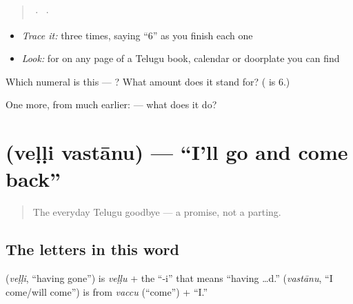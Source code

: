 \begin{quote}
  ·    ·  
\end{quote}

\begin{itemize}
\raggedright
  \item \emph{Trace it:}  three times, saying \textquotedblleft{}6\textquotedblright{} as you finish each one
  \item \emph{Look:} for  on any page of a Telugu book, calendar or doorplate you can find
\end{itemize}

\begin{tcolorbox}[breakable,colback=teal!4,colframe=teal!35!black,title={Before you move on}]
Which numeral is this — ? What amount does it stand for? ( is 6.)

One more, from much earlier:  — what does it do?
\end{tcolorbox}
\section[\texorpdfstring{\te{వెళ్ళి} \te{వస్తాను} (veḷḷi vastānu)}{వెళ్ళి వస్తాను (veḷḷi vastānu)}]{  (veḷḷi vastānu) — \textquotedblleft{}I'll go and come back\textquotedblright{}}

\label{lesson:TE-C04-velli-vastaanu}



\begin{quote}
The everyday Telugu goodbye — a promise, not a parting.
\end{quote}

\subsection*{The letters in this word}
\textbf{} (\emph{veḷḷi}, \textquotedblleft{}having gone\textquotedblright{}) is \emph{veḷḷu} + the \textquotedblleft{}-i\textquotedblright{} that means \textquotedblleft{}having …d.\textquotedblright{} \textbf{} (\emph{vastānu}, \textquotedblleft{}I come/will come\textquotedblright{}) is from \emph{vaccu} (\textquotedblleft{}come\textquotedblright{}) + \textquotedblleft{}I.\textquotedblright{}

